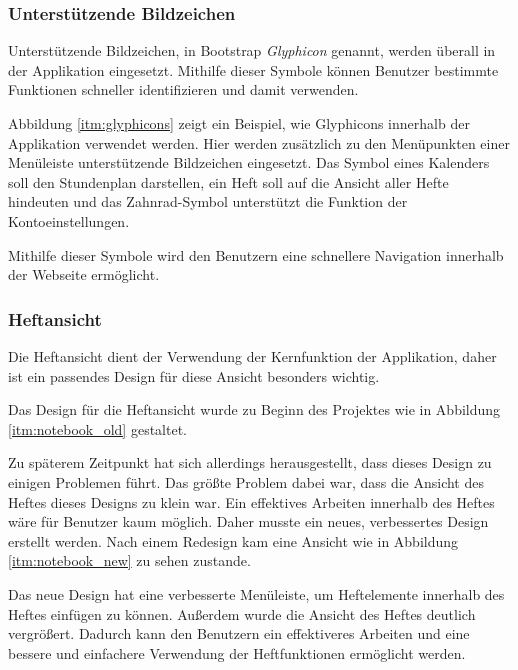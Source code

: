 \subsubsection{Unterstützende Bildzeichen}
Unterstützende Bildzeichen, in Bootstrap \textit{Glyphicon} genannt, werden überall in der Applikation eingesetzt. Mithilfe dieser Symbole können Benutzer bestimmte Funktionen schneller identifizieren und damit verwenden.


Abbildung \ref{itm:glyphicons} zeigt ein Beispiel, wie Glyphicons innerhalb der Applikation verwendet werden. Hier werden zusätzlich zu den Menüpunkten einer Menüleiste unterstützende Bildzeichen eingesetzt. Das Symbol eines Kalenders soll den Stundenplan darstellen, ein Heft soll auf die Ansicht aller Hefte hindeuten und das Zahnrad-Symbol unterstützt die Funktion der Kontoeinstellungen.

Mithilfe dieser Symbole wird den Benutzern eine schnellere Navigation innerhalb der Webseite ermöglicht.

\subsubsection{Heftansicht}
Die Heftansicht dient der Verwendung der Kernfunktion der Applikation, daher ist ein passendes Design für diese Ansicht besonders wichtig.

Das Design für die Heftansicht wurde zu Beginn des Projektes wie in Abbildung \ref{itm:notebook_old} gestaltet.


Zu späterem Zeitpunkt hat sich allerdings herausgestellt, dass dieses Design zu einigen Problemen führt. Das größte Problem dabei war, dass die Ansicht des Heftes dieses Designs zu klein war. Ein effektives Arbeiten innerhalb des Heftes wäre für Benutzer kaum möglich. Daher musste ein neues, verbessertes Design erstellt werden. Nach einem Redesign kam eine Ansicht wie in Abbildung \ref{itm:notebook_new} zu sehen zustande.


Das neue Design hat eine verbesserte Menüleiste, um Heftelemente innerhalb des Heftes einfügen zu können. Außerdem wurde die Ansicht des Heftes deutlich vergrößert. Dadurch kann den Benutzern ein effektiveres Arbeiten und eine bessere und einfachere Verwendung der Heftfunktionen ermöglicht werden.
